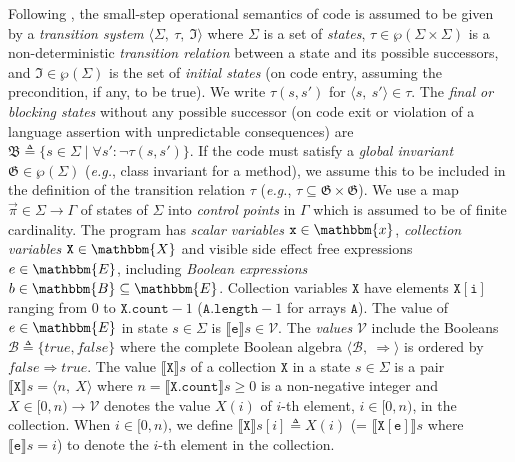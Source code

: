 \documentclass[envcountsame]{llncs}
\makeatletter
\newif\iflong\longfalse%
\let\llncsvec\vec
\renewcommand{\vec}[1]{\@ifnextchar'{\@vec{#1}\mskip3mu}{\@vec{#1}\mskip1.5mu}}
\newcommand{\sqb}[1]{\llbracket#1\rrbracket}
\newcommand{\ltuple}[1]{\langle#1,\allowbreak}
\newcommand{\mtuple}[1]{\:#1,\allowbreak}
\newcommand{\rtuple}[1]{\:#1\rangle}
\newcommand{\pair}[2]{\ltuple{#1}\rtuple{#2}}
\newcommand{\triple}[3]{\ltuple{#1}\mtuple{#2}\rtuple{#3}}
\newcommand{\implies}{\ensuremath{\Rightarrow}}
\newcommand{\controlpoint}[1]{\llncsvec{\pi}#1}
\makeatother
\begin{document}
Following \cite{Cousot78-1-TheseEtat}, the small-step operational semantics of code is assumed to be given by a \emph{transition system} $\triple{\Sigma}{\tau}{\mathfrak{I}}$
where $\Sigma$ is a set of \emph{states}, $\tau\in\wp(\Sigma\times \Sigma)$ is a non-deterministic \emph{transition relation} between a state and its possible successors, and $\mathfrak{I}\in\wp(\Sigma)$ is the set of \emph{initial states} (on code entry, assuming the precondition, if any, to be true). We write $\tau(s,s')$ for $\pair{s}{s'}\in\tau$. The \emph{final or blocking states} without any possible successor (on code exit or violation of a language assertion with unpredictable consequences) are $\mathfrak{B}\triangleq\{s\in\Sigma\mid \forall s': \neg\tau (s,s')\}$. If the code must satisfy a \emph{global invariant} $\mathfrak{G}\in\wp(\Sigma)$ (\emph{e.g.}, class invariant for a method), we assume this to be included in the definition of the transition relation $\tau$ (\emph{e.g.}, $\tau\subseteq \mathfrak{G}\times \mathfrak{G}$). We use a map $\controlpoint{}\in\Sigma\rightarrow\Gamma$ of states of $\Sigma$ into \emph{control points} in $\Gamma$ which is assumed to be of finite cardinality. The program has \emph{scalar variables}  $\mathtt{x}\in\mathbbm{x}$, \emph{collection variables} $\mathtt{X}\in\mathbbm{X}$ and visible side effect free expressions $\texttt{e}\in\mathbbm{E}$, including \emph{Boolean expressions} $\texttt{b}\in\mathbbm{B}\subseteq\mathbbm{E}$. Collection variables $\mathtt{X}$ have elements $\mathtt{X[i]}$ ranging from 0 to $\mathtt{X.count}-1$ ($\mathtt{A.length}-1$ for arrays $\mathtt{A}$). The value of $\texttt{e}\in\mathbbm{E}$ in state $s\in\Sigma$ is $\sqb{\texttt{e}}s\in\mathcal{V}$. The \emph{values} $\mathcal{V}$ include the Booleans $\mathcal{B}\triangleq\{\mathit{true},\mathit{false}\}$ where the complete Boolean algebra  $\pair{\mathcal{B}}{\implies}$ is ordered by $\mathit{false} \implies\mathit{true}$. The value $\sqb{\mathtt{X}}s$ of a collection $\mathtt{X}$ in a state $s\in\Sigma$ is a pair $\sqb{\mathtt{X}}s=\pair{n}{X}$ where $n=\sqb{\mathtt{X}.\texttt{count}}s\geqslant0$ is a non-negative integer and $X\in[0,n)\rightarrow\mathcal{V}$ denotes the value $X(i)$ of $i$-th element, $i\in[0,n)$, in the collection. When $i\in[0,n)$, we define $\sqb{\mathtt{X}}s[i]\triangleq X(i)$ (= $\sqb{\mathtt{X[e]}}s$ where $\sqb{\mathtt{e}}s=i$) to denote the $i$-th element in the collection. \iflong The collection index expressions are assumed to be converted in canonical normal form (\emph{e.g.}, via auxiliary variables, so that \emph{e.g.}, for integer arrays, \texttt{...A[B[i]]...}  becomes \texttt{...\{int x; x := B[i]; A[x]\}...}).\fi
\end{document}
